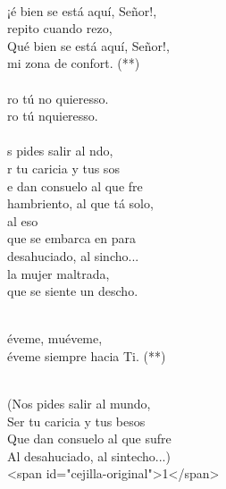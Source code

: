 \begin{cancion}%
	  \\
	¡é bien se está aquí, Señor!, \\
	 repito cuando rezo,\\
	Qué bien se está aquí, Señor!,\\
	 mi zona de confort. (**)\\
\jump\\
	ro tú no quieresso.\\
	ro tú nquieresso.\\
\jump\\
	s pides salir al ndo,\\
	r tu caricia y tus sos\\
	e dan consuelo al que fre\\
	 hambriento, al que tá solo, \\
	al eso\\
	 que se embarca en para\\
	 desahuciado, al sincho...\\
	la mujer maltrada,\\
	 que se siente un descho.\\\jump\\
	\begin{chorus}%
	éveme, muéveme,\\
	éveme siempre hacia Ti. (**)\\
	\end{chorus}%
	\jump\\
(Nos pides salir al mundo,\\
 Ser tu caricia y tus besos\\
 Que dan consuelo al que sufre\\
 Al desahuciado, al sintecho...)\\
 <span id="cejilla-original">1</span>\\
\end{cancion}%
